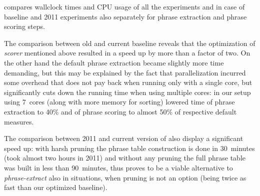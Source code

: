  compares wallclock times and CPU usage of all the
experiments and in case of baseline and 2011 experiments also separately for phrase
extraction and phrase scoring steps.

The comparison between old and current baseline reveals that the optimization of
\emph{scorer} mentioned above resulted in a speed up by more than a factor of two.
On the other hand the default phrase extraction became slightly more time demanding,
but this may be explained by the fact that parallelization incurred some overhead
that does not pay back when running only with a single core, but significantly cuts
down the running time when using multiple cores: in our setup using 7~cores (along with
more memory for sorting) lowered time of phrase extraction to 40\% and of phrase scoring
to almost 50\% of respective default measures.

The comparison between 2011 and current version of \eppex{} also display a significant
speed up: with harsh pruning the phrase table construction is done in 30~minutes (took
almost two hours in 2011) and without any pruning the full phrase table was built in
less than 90~minutes, thus \eppex{} proves to be a viable alternative to
\emph{phrase-extract} also in situations, when pruning is not an option (being twice as
fast than our optimized baseline).

